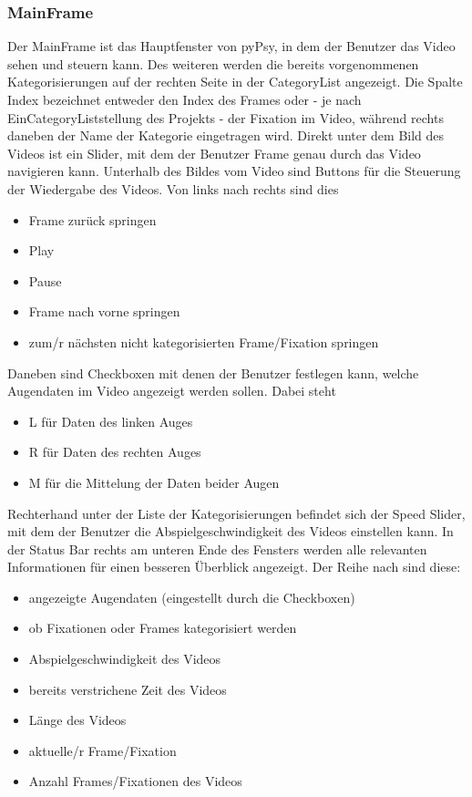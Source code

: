 \documentclass[a4paper,draft]{scrartcl}
\begin{document}
\subsubsection{MainFrame}
Der MainFrame ist das Hauptfenster von pyPsy, in dem der Benutzer das Video sehen und steuern kann. Des weiteren werden die bereits vorgenommenen Kategorisierungen auf der rechten Seite in der CategoryList angezeigt. Die Spalte Index bezeichnet entweder den Index des Frames oder - je nach EinCategoryListstellung des Projekts - der Fixation im Video, während rechts daneben der Name der Kategorie eingetragen wird. 
Direkt unter dem Bild des Videos ist ein Slider, mit dem der Benutzer Frame genau durch das Video navigieren kann.
Unterhalb des Bildes vom Video sind Buttons für die Steuerung der Wiedergabe des Videos. Von links nach rechts sind dies
\begin{itemize}
\item Frame zurück springen
\item Play
\item Pause
\item Frame nach vorne springen
\item zum/r nächsten nicht kategorisierten Frame/Fixation springen
\end{itemize}
Daneben sind Checkboxen mit denen der Benutzer festlegen kann, welche Augendaten im Video angezeigt werden sollen. Dabei steht
\begin{itemize}
\item L für Daten des linken Auges
\item R für Daten des rechten Auges
\item M für die Mittelung der Daten beider Augen
\end{itemize}
Rechterhand unter der Liste der Kategorisierungen befindet sich der Speed Slider, mit dem der Benutzer die Abspielgeschwindigkeit des Videos einstellen kann. 
In der Status Bar rechts am unteren Ende des Fensters werden alle relevanten Informationen für einen besseren Überblick angezeigt. Der Reihe nach sind diese:
\begin{itemize}
\item angezeigte Augendaten (eingestellt durch die Checkboxen)
\item ob Fixationen oder Frames kategorisiert werden
\item Abspielgeschwindigkeit des Videos
\item bereits verstrichene Zeit des Videos
\item Länge des Videos
\item aktuelle/r Frame/Fixation 
\item Anzahl Frames/Fixationen des Videos
\end{itemize}
\end{document}
